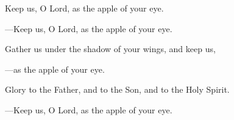 \responsory
\begin{hangpar}

Keep us, O Lord, as the apple of your eye.

{\color{red}---\thinspace}Keep us, O Lord, as the apple of your eye.

\medskip Gather us under the shadow of your wings, and keep us,

{\color{red}---\thinspace}as the apple of your eye.

\medskip Glory to the Father, and to the Son, and to the Holy Spirit.

{\color{red}---\thinspace}Keep us, O Lord, as the apple of your eye.
\end{hangpar}
